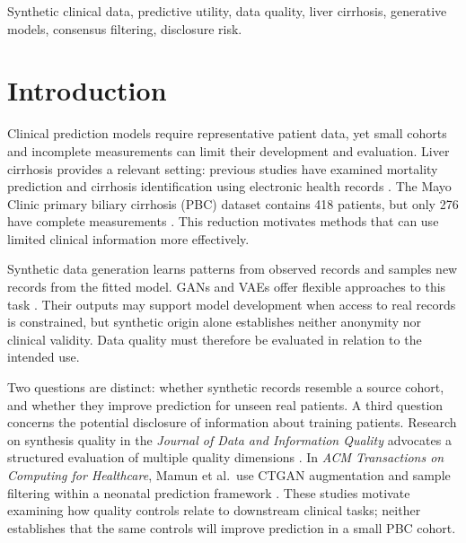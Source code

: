 \documentclass[journal]{IEEEtran}
\begin{document}
\begin{IEEEkeywords}
Synthetic clinical data, predictive utility, data quality, liver cirrhosis, generative models, consensus filtering, disclosure risk.
\end{IEEEkeywords}

\FloatBarrier
\section{Introduction}

Clinical prediction models require representative patient data, yet small cohorts and incomplete measurements can limit their development and evaluation. Liver cirrhosis provides a relevant setting: previous studies have examined mortality prediction and cirrhosis identification using electronic health records \cite{guo2021,obeid2023,kanwal2020}. The Mayo Clinic primary biliary cirrhosis (PBC) dataset contains 418 patients, but only 276 have complete measurements \cite{fleming1991,ucipbc}. This reduction motivates methods that can use limited clinical information more effectively.

Synthetic data generation learns patterns from observed records and samples new records from the fitted model. GANs and VAEs offer flexible approaches to this task \cite{goncalves2020,gonzales2023,yan2022,nikolentzos2023}. Their outputs may support model development when access to real records is constrained, but synthetic origin alone establishes neither anonymity nor clinical validity. Data quality must therefore be evaluated in relation to the intended use.

Two questions are distinct: whether synthetic records resemble a source cohort, and whether they improve prediction for unseen real patients. A third question concerns the potential disclosure of information about training patients. Research on synthesis quality in the \textit{Journal of Data and Information Quality} advocates a structured evaluation of multiple quality dimensions \cite{stenger2024}. In \textit{ACM Transactions on Computing for Healthcare}, Mamun et al.\ use CTGAN augmentation and sample filtering within a neonatal prediction framework \cite{mamun2026}. These studies motivate examining how quality controls relate to downstream clinical tasks; neither establishes that the same controls will improve prediction in a small PBC cohort.
\end{document}
